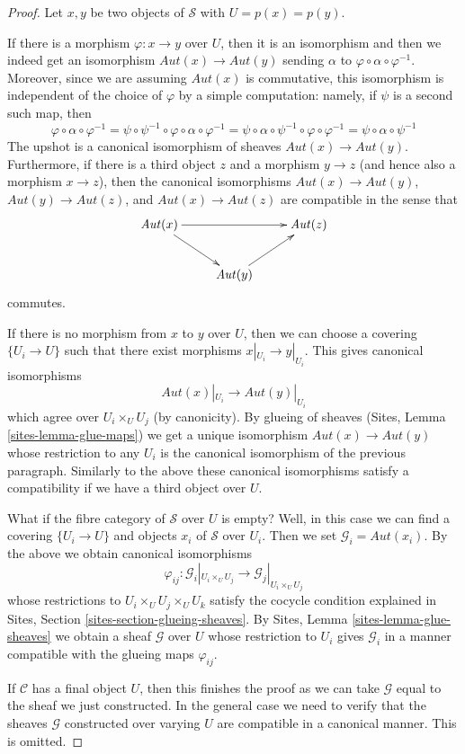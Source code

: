 \documentclass{stacks-project}
\theoremstyle{plain}
\theoremstyle{definition}
\theoremstyle{remark}
\numberwithin{equation}{subsection}
\begin{document}
\begin{proof}
Let $x, y$ be two objects of $\mathcal{S}$ with $U = p(x) = p(y)$.

\medskip\noindent
If there is a morphism $\varphi : x \to y$ over $U$, then it is an
isomorphism and then we indeed get an isomorphism
$\mathit{Aut}(x) \to \mathit{Aut}(y)$ sending
$\alpha$ to $\varphi \circ \alpha \circ \varphi^{-1}$.
Moreover, since we are assuming $\mathit{Aut}(x)$ is
commutative, this isomorphism is independent of the choice
of $\varphi$ by a simple computation: namely, if $\psi$ is
a second such map, then
$$
\varphi \circ \alpha \circ \varphi^{-1} =
\psi \circ \psi^{-1} \circ \varphi \circ \alpha \circ \varphi^{-1} =
\psi \circ \alpha \circ \psi^{-1} \circ \varphi \circ \varphi^{-1} =
\psi \circ \alpha \circ \psi^{-1}
$$
The upshot is a canonical isomorphism of sheaves
$\mathit{Aut}(x) \to \mathit{Aut}(y)$. Furthermore, if there
is a third object $z$ and a morphism $y \to z$ (and hence
also a morphism $x \to z$), then the
canonical isomorphisms $\mathit{Aut}(x) \to \mathit{Aut}(y)$,
$\mathit{Aut}(y) \to \mathit{Aut}(z)$, and
$\mathit{Aut}(x) \to \mathit{Aut}(z)$ are compatible in the sense
that
$$
\xymatrix{
\mathit{Aut}(x) \ar[rd] \ar[rr] & &  \mathit{Aut}(z) \\
& \mathit{Aut}(y) \ar[ru]
}
$$
commutes.

\medskip\noindent
If there is no morphism from $x$ to $y$ over $U$, then we can
choose a covering $\{U_i \to U\}$ such that there exist morphisms
$x|_{U_i} \to y|_{U_i}$. This gives canonical isomorphisms
$$
\mathit{Aut}(x)|_{U_i} \longrightarrow \mathit{Aut}(y)|_{U_i}
$$
which agree over $U_i \times_U U_j$ (by canonicity). By glueing of
sheaves (Sites, Lemma \ref{sites-lemma-glue-maps}) we get a unique
isomorphism $\mathit{Aut}(x) \to \mathit{Aut}(y)$ whose restriction
to any $U_i$ is the canonical isomorphism of the previous paragraph.
Similarly to the above these canonical isomorphisms satisfy
a compatibility if we have a third object over $U$.

\medskip\noindent
What if the fibre category of $\mathcal{S}$ over $U$ is empty?
Well, in this case we can find a covering $\{U_i \to U\}$
and objects $x_i$ of $\mathcal{S}$ over $U_i$. Then we set
$\mathcal{G}_i = \mathit{Aut}(x_i)$. By the above we obtain
canonical isomorphisms
$$
\varphi_{ij} :
\mathcal{G}_i|_{U_i \times_U U_j}
\longrightarrow
\mathcal{G}_j|_{U_i \times_U U_j}
$$
whose restrictions to $U_i \times_U U_j \times_U U_k$ satisfy
the cocycle condition explained in Sites, Section
\ref{sites-section-glueing-sheaves}.
By Sites, Lemma \ref{sites-lemma-glue-sheaves}
we obtain a sheaf $\mathcal{G}$ over $U$ whose
restriction to $U_i$ gives $\mathcal{G}_i$
in a manner compatible with the glueing maps $\varphi_{ij}$.

\medskip\noindent
If $\mathcal{C}$ has a final object $U$, then this finishes the proof
as we can take $\mathcal{G}$ equal to the sheaf we just constructed.
In the general case we need to verify that the sheaves $\mathcal{G}$
constructed over varying $U$ are compatible in a canonical manner.
This is omitted.
\end{proof}
\end{document}
